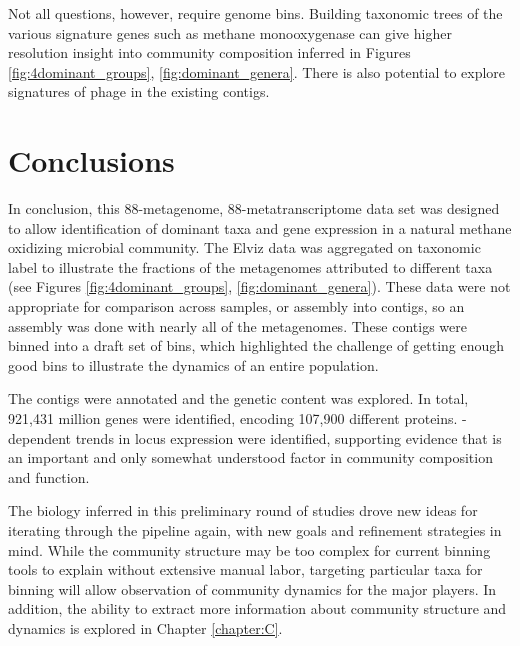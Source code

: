 Not all questions, however, require genome bins.
Building taxonomic trees of the various signature genes such as methane monooxygenase can give higher resolution insight into community composition inferred in Figures \ref{fig:4dominant_groups}, \ref{fig:dominant_genera}.
There is also potential to explore signatures of phage in the existing contigs.


\section{Conclusions}

In conclusion, this 88-metagenome, 88-metatranscriptome data set was designed to allow identification of dominant taxa and gene expression in a natural methane oxidizing microbial community.
The Elviz data was aggregated on taxonomic label to illustrate the fractions of the metagenomes attributed to different taxa (see Figures \ref{fig:4dominant_groups}, \ref{fig:dominant_genera}).
These data were not appropriate for comparison across samples, or assembly into contigs, so an assembly was done with nearly all of the metagenomes.
These contigs were binned into a draft set of bins, which highlighted the challenge of getting enough good bins to illustrate the dynamics of an entire population.

The contigs were annotated and the genetic content was explored.
In total, 921,431 million genes were identified, encoding 107,900 different proteins.
-dependent trends in locus expression were identified, supporting evidence that  is an important and only somewhat understood factor in community composition and function.

The biology inferred in this preliminary round of studies drove new ideas for iterating through the pipeline again, with new goals and refinement strategies in mind.
While the community structure may be too complex for current binning tools to explain without extensive manual labor, targeting particular taxa for binning will allow observation of community dynamics for the major players.
In addition, the ability to extract more information about community structure and dynamics is explored in Chapter \ref{chapter:C}.


